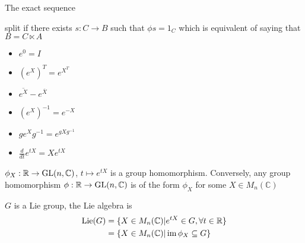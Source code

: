 \documentclass[main]{subfiles}
\begin{document}
\begin{definition}
The exact sequence
\begin{center}
\end{center}
split if there exists $s:C\to B$ such that $\phi s=1_C$ which is equivalent of saying that $B=C\ltimes A$
\end{definition}

\begin{lemma}
\begin{itemize}
\item $e^0=I$
\item $(e^X)^T=e^{X^T}$
\item $\overline{e^X}-e^{\overline X}$
\item $(e^X)^{-1}=e^{-X}$
\item $ge^Xg^{-1}=e^{gXg^{-1}}$
\item $\frac{d}{dt}e^{tX}=Xe^{tX}$
\end{itemize}
\end{lemma}

\begin{theorem}
$\phi_X:\mathbb R\to\operatorname{GL}(n,\mathbb C)$, $t\mapsto e^{tX}$ is a group homomorphism. Conversely, any group homomorphism $\phi:\mathbb R\to\operatorname{GL}(n,\mathbb C)$ is of the form $\phi_X$ for some $X\in M_n(\mathbb C)$
\end{theorem}

\begin{definition}
$G$ is a Lie group, the Lie algebra is
\begin{align*}
\operatorname{Lie}(G)&=\{X\in M_n(\mathbb C)|e^{tX}\in G,\forall t\in\mathbb R\} \\
&=\{X\in M_n(\mathbb C)|\operatorname{im}\phi_X\subseteq G\}
\end{align*}
\end{definition}
\end{document}
